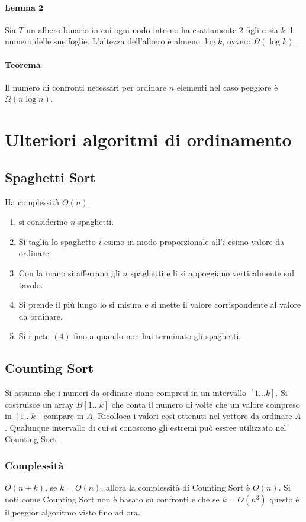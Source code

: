 \paragraph{Lemma $\mathbf{2}$}
Sia $T$ un albero binario in cui ogni nodo interno ha esattamente $2$ figli e sia $k$ il numero delle sue foglie. L'altezza dell'albero \`e almeno $\log k$, ovvero $\Omega(\log k)$. 
\paragraph{Teorema}
Il numero di confronti necessari per ordinare $n$ elementi nel caso peggiore \`e $\Omega(n\log n)$. 
\section{Ulteriori algoritmi di ordinamento}
\subsection{Spaghetti Sort}
Ha complessit\`a $O(n)$.
\begin{enumerate}
	\item si considerino $n$ spaghetti.
	\item Si taglia lo spaghetto $i$-esimo in modo proporzionale all'$i$-esimo valore da ordinare.
	\item Con la mano si afferrano gli $n$ spaghetti e li si appoggiano verticalmente sul tavolo. 
	\item Si prende il pi\`u lungo lo si misura e si mette il valore corrispondente al valore da ordinare. 
	\item Si ripete $(4)$ fino a quando non hai terminato gli spaghetti. 
\end{enumerate}
\subsection{Counting Sort}
Si assuma che i numeri da ordinare siano compresi in un intervallo $[1\dots k]$. Si costruisce un array $B[1\dots k]$ che conta il numero di volte che un valore compreso in $[1\dots k]$
compare in $A$. Ricolloca i valori cos\`i ottenuti nel vettore da ordinare $A$. Qualunque intervallo di cui si conoscono gli estremi pu\`o essree utilizzato nel Counting Sort. 

\subsubsection{Complessit\`a}
$O(n+k)$, se $k = O(n)$, allora la complessit\`a di Counting Sort \`e $O(n)$. Si noti come Counting Sort non \`e basato su confronti e che se $k = O(n^3)$ questo \`e il peggior algoritmo
visto fino ad ora. 
